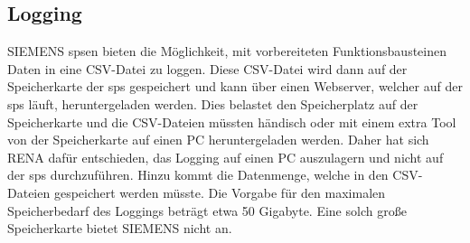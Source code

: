 \subsection{Logging}
SIEMENS \ac{sps}en bieten die Möglichkeit, mit vorbereiteten Funktionsbausteinen Daten in eine CSV-Datei zu loggen. Diese CSV-Datei wird dann auf der Speicherkarte der \ac{sps} gespeichert und kann über einen Webserver, welcher auf der \ac{sps} läuft, heruntergeladen werden. Dies belastet den Speicherplatz auf der Speicherkarte und die CSV-Dateien müssten händisch oder mit einem extra Tool von der Speicherkarte auf einen PC heruntergeladen werden. Daher hat sich RENA dafür entschieden, das Logging auf einen PC auszulagern und nicht auf der \ac{sps} durchzuführen. Hinzu kommt die Datenmenge, welche in den CSV-Dateien gespeichert werden müsste. Die Vorgabe für den maximalen Speicherbedarf des Loggings beträgt etwa 50 Gigabyte. Eine solch große Speicherkarte bietet SIEMENS nicht an.

